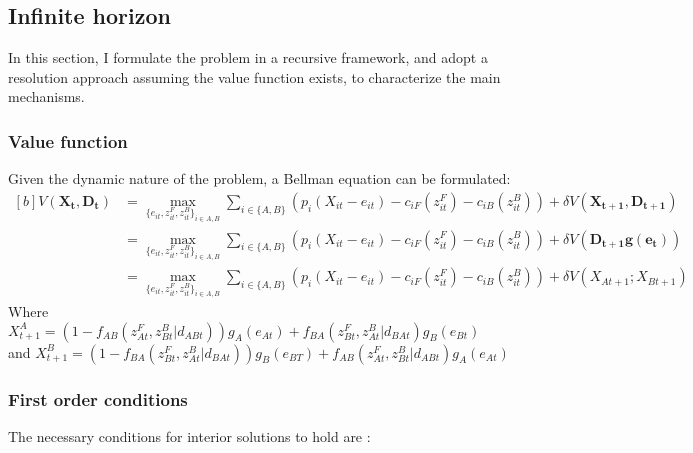 \documentclass{article}
\begin{document}
\subsection{Infinite horizon}
In this section, I formulate the problem in a recursive framework, and adopt a resolution approach assuming the value function exists, to characterize the main mechanisms. 
\subsubsection{Value function}
Given the dynamic nature of the problem, a Bellman equation can be formulated: 
\begin{equation}
\begin{aligned}[b]
V(\mathbf{X_t,D_t}) &= \max_{ \{e_{it}, z_{it}^F, z_{it}^B\}_{i \in A,B} } \sum_{i \in \{A,B\}} \left( p_i(X_{it} - e_{it}) - c_{iF}(z_{it}^F) - c_{iB}(z_{it}^B) \right)+ \delta V\left(\mathbf{X_{t+1}, D_{t+1}}\right)\\
& = \max_{ \{e_{it}, z_{it}^F, z_{it}^B\}_{i \in A,B} } \sum_{i \in \{A,B\}} \left(p_i(X_{it} - e_{it}) - c_{iF}(z_{it}^F) - c_{iB}(z_{it}^B) \right) + \delta V(\mathbf{D_{t+1}g(e_t)})\\
&= \max_{ \{e_{it}, z_{it}^F, z_{it}^B\}_{i \in A,B} } \sum_{i \in \{A,B\}} \left( p_i(X_{it} - e_{it}) - c_{iF}(z_{it}^F) - c_{iB}(z_{it}^B)\right) + \delta V\left(X_{At+1}; X_{Bt+1} \right)
\end{aligned}
\end{equation}
Where $X_{t+1}^A = (1-f_{AB}(z^F_{At}, z^B_{Bt}| d_{ABt}))g_A(e_{At})+f_{BA}(z^F_{Bt}, z^B_{At}| d_{BAt})g_B(e_{Bt})$\\

and $X_{t+1}^B =(1 - f_{BA}(z^F_{Bt}, z^B_{At}| d_{BAt}))g_B(e_{BT}) +f_{AB}(z^F_{At}, z^B_{Bt}| d_{ABt})g_A(e_{At})$

\subsubsection{First order conditions}
The necessary conditions for interior solutions to hold are :
\end{document}
